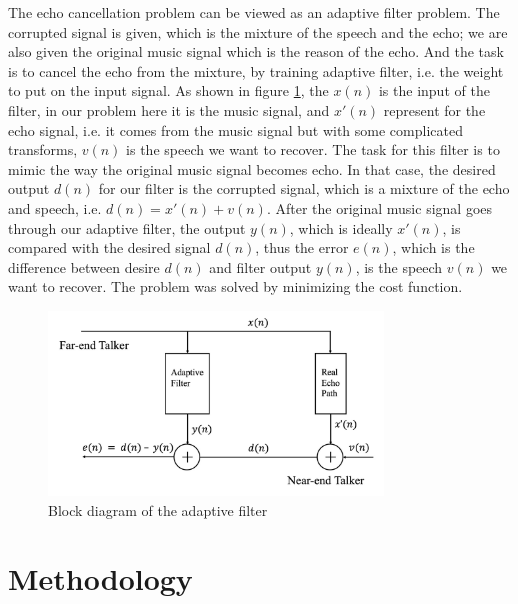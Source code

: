 \documentclass[conference]{IEEEtran}
\begin{document}
The echo cancellation problem can be viewed as an adaptive filter problem. The corrupted signal is given, which is the mixture of the speech and the echo; we are also given the original music signal which is the reason of the echo. And the task is to cancel the echo from the mixture, by training adaptive filter, i.e. the weight to put on the input signal. As shown in figure \ref{filter}, the $x(n)$ is the input of the filter, in our problem here it is the music signal, and $x'(n)$ represent for the echo signal, i.e. it comes from the music signal but with some complicated transforms, $v(n)$ is the speech we want to recover. The task for this filter is to mimic the way the original music signal becomes echo. In that case, the desired output $d(n)$ for our filter is the corrupted signal, which is a mixture of the echo and speech, i.e. $d(n) = x'(n) + v(n)$. After the original music signal goes through our adaptive filter, the output $y(n)$, which is ideally $x'(n)$, is compared with the desired signal $d(n)$, thus the error $e(n)$, which is the difference between desire $d(n)$ and filter output $y(n)$, is the speech $v(n)$ we want to recover. The problem was solved by minimizing the cost function.
\begin{figure}[htbp]
\centerline{\includegraphics[width=3.5in]{FilterDiagram.jpg}}
\caption{Block diagram of the adaptive filter}
\label{filter}
\end{figure}


\section{Methodology}
\end{document}
